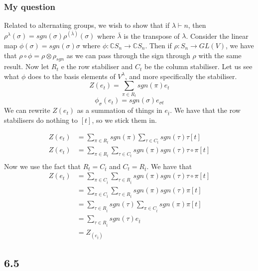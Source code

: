 \documentclass[]{article}
\begin{document}
\subsubsection*{My question}
Related to alternating groups, we wish to show that if $\lambda \vdash n$, then $\rho^\lambda(\sigma) = sgn(\sigma) \rho^{(\overline{\lambda})}(\sigma)$ where $\overline{\lambda}$ is the transpose of $\lambda$.
Consider the linear map $\phi(\sigma) = sgn(\sigma) \sigma$ where $\phi : \mathbb{C}S_n \rightarrow \mathbb{C} S_n$. Then if $\rho : S_n \rightarrow GL(V)$, we have that $\rho \circ \phi = \rho \otimes \rho_{sgn}$ as we can pass through the sign through $\rho$ with the same result.
Now let $R_t$ e the row stabiliser and $C_t$ be the column stabiliser. 
Let us see what $\phi$ does to the basis elements of $V^\lambda$, and more specifically the stabiliser. 
\begin{equation}
	Z(e_t) = \sum_{\pi \in R_t} sgn(\pi) e_t
\end{equation}
\begin{equation}
	\phi_\sigma(e_t) = sgn(\sigma) e_{\sigma t}
\end{equation}
We can rewrite $Z(e_t)$ as a summation of things in $e_{\overline{t}}$. We have that the row stabilisers do nothing to $[t]$, so we stick them in. 

\begin{align*}
	Z(e_t) &= \sum_{\pi \in R_t} sgn(\pi) \sum_{\tau \in C_t} sgn(\tau) \tau[t]\\
	Z(e_t) &= \sum_{\pi \in R_t}  \sum_{\tau \in C_t} sgn(\pi) sgn(\tau) \tau \circ \pi [t]\\
\end{align*}
Now we use the fact that $R_t = C_{\overline{t}}$ and $C_t = R_{\overline{t}}$. We have that
\begin{align*}
	Z(e_t) &= \sum_{\pi \in C_{\overline{t}}}  \sum_{\tau \in R_{\overline{t}}} sgn(\pi) sgn(\tau) \tau \circ \pi [t]\\
	&= \sum_{\pi \in C_{\overline{t}}}  \sum_{\tau\in R_{\overline{t}}} sgn(\pi) sgn(\tau) \pi [t]\\
	&= \sum_{\tau\in R_{\overline{t}}} sgn(\tau) \sum_{\pi \in C_{\overline{t}}}  sgn(\pi)  \pi [t]\\
	&= \sum_{\tau\in R_{\overline{t}}} sgn(\tau) e_{\overline{t}}\\
	&= Z_(e_{\overline{t}})
\end{align*}

\subsection*{6.5}
\end{document}
